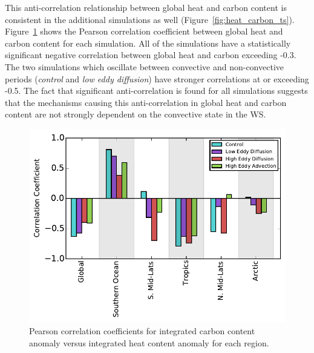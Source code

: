 This anti-correlation relationship between global heat and carbon content is
consistent in the additional simulations as well (Figure~\ref{fig:heat_carbon_ts}).
Figure~\ref{fig:corr_coeff} shows the Pearson
correlation coefficient between global heat and carbon content for each
simulation. All of the simulations have a statistically significant negative
correlation between global heat and carbon exceeding -0.3. The two simulations
which oscillate between convective and non-convective periods (\textit{control} and \textit{low eddy
diffusion}) have stronger correlations at or exceeding -0.5. The fact that
significant anti-correlation is found for all simulations suggests that
the mechanisms causing this anti-correlation in global heat and carbon content
are not strongly dependent on the convective state in the WS.

\begin{figure}
\noindent
\centering
\includegraphics[width=33pc]{figure6.pdf}
\caption{Pearson correlation coefficients for integrated carbon content anomaly
versus integrated heat content anomaly for each region.}
\label{fig:corr_coeff}
\end{figure}

